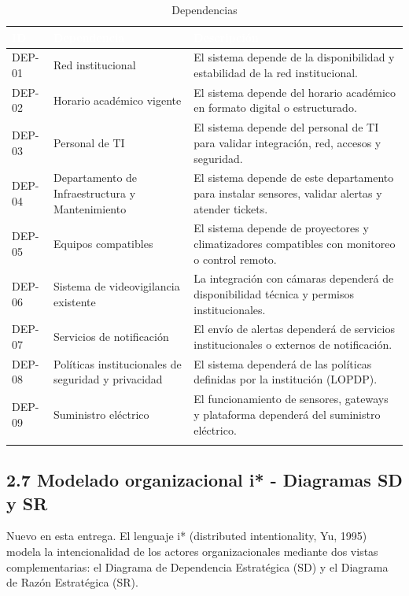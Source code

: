 
\begingroup
\small
\begin{longtable}{|P{0.3333}|P{0.3333}|P{0.3333}|}
\hline
{}\textcolor{white}{\textbf{ID}} & \textcolor{white}{\textbf{Dependencia}} & \textcolor{white}{\textbf{Descripción}} \\ \hline
DEP-01 & Red institucional & El sistema depende de la disponibilidad y estabilidad de la red institucional. \\ \hline
DEP-02 & Horario académico vigente & El sistema depende del horario académico en formato digital o estructurado. \\ \hline
DEP-03 & Personal de TI & El sistema depende del personal de TI para validar integración, red, accesos y seguridad. \\ \hline
DEP-04 & Departamento de Infraestructura y Mantenimiento & El sistema depende de este departamento para instalar sensores, validar alertas y atender tickets. \\ \hline
DEP-05 & Equipos compatibles & El sistema depende de proyectores y climatizadores compatibles con monitoreo o control remoto. \\ \hline
DEP-06 & Sistema de videovigilancia existente & La integración con cámaras dependerá de disponibilidad técnica y permisos institucionales. \\ \hline
DEP-07 & Servicios de notificación & El envío de alertas dependerá de servicios institucionales o externos de notificación. \\ \hline
DEP-08 & Políticas institucionales de seguridad y privacidad & El sistema dependerá de las políticas definidas por la institución (LOPDP). \\ \hline
DEP-09 & Suministro eléctrico & El funcionamiento de sensores, gateways y plataforma dependerá del suministro eléctrico. \\ \hline
\caption{Dependencias}
\end{longtable}
\endgroup

\subsection*{2.7 Modelado organizacional i* - Diagramas SD y SR}


Nuevo en esta entrega. El lenguaje i* (distributed intentionality, Yu, 1995) modela la intencionalidad de los actores organizacionales mediante dos vistas complementarias: el Diagrama de Dependencia Estratégica (SD) y el Diagrama de Razón Estratégica (SR).


